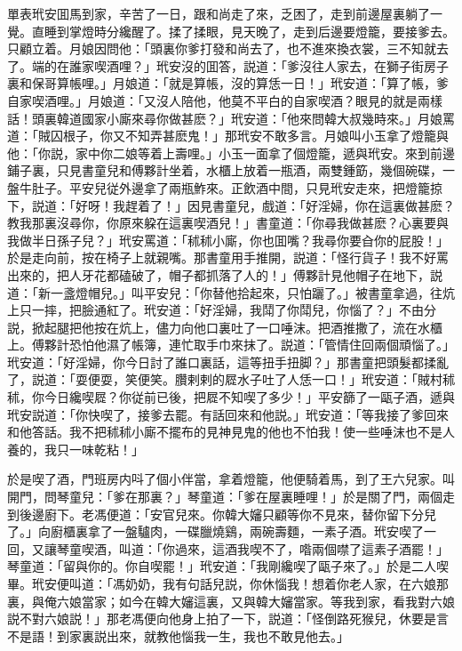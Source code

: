 單表玳安囬馬到家，辛苦了一日，跟和尚走了來，乏困了，走到前邊屋裏躺了一覺。直睡到掌燈時分纔醒了。揉了揉眼，見天晚了，走到后邊要燈籠，要接爹去。只顧立着。月娘因問他：「頭裏你爹打發和尚去了，也不進來換衣裳，三不知就去了。端的在誰家喫酒哩？」玳安沒的囬答，説道：「爹沒往人家去，在獅子街房子裏和保哥算帳哩。」月娘道：「就是算帳，沒的算恁一日！」玳安道：「算了帳，爹自家喫酒哩。」月娘道：「又沒人陪他，他莫不平白的自家喫酒？眼見的就是兩樣話！頭裏韓道國家小廝來尋你做甚麽？」玳安道：「他來問韓大叔幾時來。」月娘罵道：「賊囚根子，你又不知弄甚麽鬼！」那玳安不敢多言。月娘叫小玉拿了燈籠與他：「你説，家中你二娘等着上壽哩。」小玉一面拿了個燈籠，遞與玳安。來到前邊鋪子裏，只見書童兒和傅夥計坐着，水櫃上放着一瓶酒，兩雙鍾筯，幾個碗碟，一盤牛肚子。平安兒従外邊拿了兩瓶鮓來。正飲酒中間，只見玳安走來，把燈籠掠下，説道：「好呀！我趕着了！」因見書童兒，戲道：「好淫婦，你在這裏做甚麽？教我那裏沒尋你，你原來躱在這裏喫酒兒！」書童道：「你尋我做甚麽？心裏要與我做半日孫子兒？」玳安罵道：「秫秫小廝，你也囬嘴？我尋你要㒲你的屁股！」於是走向前，按在椅子上就親嘴。那書童用手推開，説道：「怪行貨子！我不好罵出來的，把人牙花都磕破了，帽子都抓落了人的！」傅夥計見他帽子在地下，説道：「新一盞燈帽兒。」叫平安兒：「你替他拾起來，只怕躧了。」被書童拿過，往炕上只一摔，把臉通紅了。玳安道：「好淫婦，我鬦了你鬦兒，你惱了？」不由分説，掀起腿把他按在炕上，儘力向他口裏吐了一口唾沫。把酒推撒了，流在水櫃上。傅夥計恐怕他濕了帳簿，連忙取手巾來抹了。説道：「管情住回兩個頑惱了。」玳安道：「好淫婦，你今日討了誰口裏話，這等扭手扭脚？」那書童把頭髮都揉亂了，説道：「耍便耍，笑便笑。臢剌剌的㞞水子吐了人恁一口！」玳安道：「賊村秫秫，你今日纔喫㞞？你従前已後，把㞞不知喫了多少！」平安篩了一甌子酒，遞與玳安説道：「你快喫了，接爹去罷。有話回來和他説。」玳安道：「等我接了爹回來和他答話。我不把秫秫小廝不擺布的見神見鬼的他也不怕我！使一些唾沫也不是人養的，我只一味乾粘！」

於是喫了酒，門班房内呌了個小伴當，拿着燈籠，他便騎着馬，到了王六兒家。叫開門，問琴童兒：「爹在那裏？」琴童道：「爹在屋裏睡哩！」於是關了門，兩個走到後邊廚下。老馮便道：「安官兒來。你韓大嬸只顧等你不見來，替你留下分兒了。」向廚櫃裏拿了一盤驢肉，一碟臘燒鷄，兩碗壽麵，一素子酒。玳安喫了一回，又讓琴童喫酒，叫道：「你過來，這酒我喫不了，喒兩個噤了這素子酒罷！」琴童道：「留與你的。你自喫罷！」玳安道：「我剛纔喫了甌子來了。」於是二人喫畢。玳安便叫道：「馮奶奶，我有句話兒説，你休惱我！想着你老人家，在六娘那裏，與俺六娘當家；如今在韓大嬸這裏，又與韓大嬸當家。等我到家，看我對六娘説不對六娘説！」那老馮便向他身上拍了一下，説道：「怪倒路死猴兒，休要是言不是語！到家裏説出來，就教他惱我一生，我也不敢見他去。」

